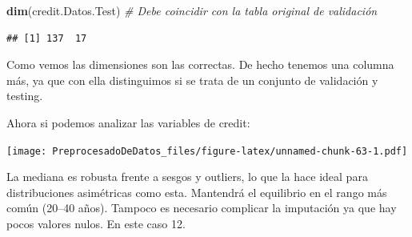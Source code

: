 \documentclass[
]{article}
\newenvironment{Shaded}{\begin{snugshade}}{\end{snugshade}}
\newcommand{\AttributeTok}[1]{\textcolor[rgb]{0.13,0.29,0.53}{#1}}
\newcommand{\CommentTok}[1]{\textcolor[rgb]{0.56,0.35,0.01}{\textit{#1}}}
\newcommand{\DecValTok}[1]{\textcolor[rgb]{0.00,0.00,0.81}{#1}}
\newcommand{\FloatTok}[1]{\textcolor[rgb]{0.00,0.00,0.81}{#1}}
\newcommand{\FunctionTok}[1]{\textcolor[rgb]{0.13,0.29,0.53}{\textbf{#1}}}
\newcommand{\NormalTok}[1]{#1}
\newcommand{\SpecialCharTok}[1]{\textcolor[rgb]{0.81,0.36,0.00}{\textbf{#1}}}
\newcommand{\StringTok}[1]{\textcolor[rgb]{0.31,0.60,0.02}{#1}}
\begin{document}
\begin{Shaded}
\begin{Highlighting}[]
\FunctionTok{dim}\NormalTok{(credit.Datos.Test)   }\CommentTok{\# Debe coincidir con la tabla original de validación}
\end{Highlighting}
\end{Shaded}

\begin{verbatim}
## [1] 137  17
\end{verbatim}

Como vemos las dimensiones son las correctas. De hecho tenemos una
columna más, ya que con ella distinguimos si se trata de un conjunto de
validación y testing.

Ahora si podemos analizar las variables de credit:\\

\begin{Shaded}
\end{Shaded}

\texttt{[image: PreprocesadoDeDatos\_files/figure-latex/unnamed-chunk-63-1.pdf]}

La mediana es robusta frente a sesgos y outliers, lo que la hace ideal
para distribuciones asimétricas como esta. Mantendrá el equilibrio en el
rango más común (20--40 años). Tampoco es necesario complicar la
imputación ya que hay pocos valores nulos. En este caso 12.
\end{document}
